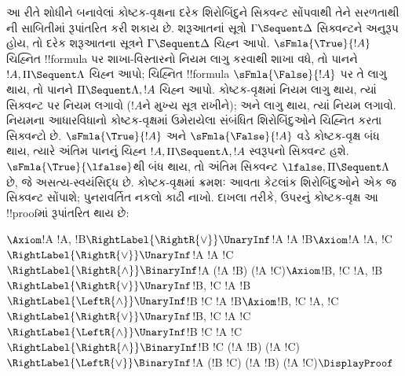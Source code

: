\documentclass[../../../include/open-logic-section]{subfiles}
\begin{document}
આ રીતે શોધીને બનાવેલાં કોષ્ટક-વૃક્ષના દરેક
શિરોબિંદુને સિક્વન્ટ સોંપવાથી તેને સરળતાથી
ની સાબિતીમાં રૂપાંતરિત કરી શકાય છે.
શરૂઆતનાં સૂત્રો $\Gamma \Sequent \Delta$
સિક્વન્ટને અનુરૂપ હોય, તો દરેક શરૂઆતના
સૂત્રને $\Gamma \Sequent \Delta$ ચિહ્ન આપો.
$\sFmla{\True}{!A}$ ચિહ્નિત !!{formula}
પર શાખા-વિસ્તારનો નિયમ લાગુ કરવાથી શાખા
વધે, તો પાનને $!A, \Pi \Sequent \Lambda$
ચિહ્ન આપો; ચિહ્નિત !!{formula}
$\sFmla{\False}{!A}$ પર તે
લાગુ થાય, તો પાનને $\Pi \Sequent \Lambda, !A$
ચિહ્ન આપો. કોષ્ટક-વૃક્ષમાં
\TRule{\True}{\star} નિયમ લાગુ થાય, ત્યાં
સિક્વન્ટ પર \LeftR{\star} નિયમ લગાવો
($!A$ને મુખ્ય સૂત્ર રાખીને); અને
\TRule{\False}{\star} લાગુ થાય, ત્યાં
\RightR{\star} નિયમ લગાવો. નિયમના
આધારવિધાનો કોષ્ટક-વૃક્ષમાં ઉમેરાયેલા
સંબંધિત શિરોબિંદુઓને ચિહ્નિત કરતા સિક્વન્ટો
છે. $\sFmla{\True}{!A}$ અને
$\sFmla{\False}{!A}$ વડે કોષ્ટક-વૃક્ષ બંધ
થાય, ત્યારે અંતિમ પાનનું ચિહ્ન
$!A, \Pi \Sequent \Lambda, !A$ સ્વરૂપનો
સિક્વન્ટ હશે. $\sFmla{\True}{\lfalse}$થી બંધ
થાય, તો અંતિમ સિક્વન્ટ $\lfalse,\Pi\Sequent\Lambda$
છે, જે અસત્ય-સ્વયંસિદ્ધ છે. કોષ્ટક-વૃક્ષમાં ક્રમશઃ આવતા
કેટલાંક શિરોબિંદુઓને એક જ સિક્વન્ટ સોંપાશે;
પુનરાવર્તિત નકલો કાઢી નાખો. દાખલા તરીકે,
ઉપરનું કોષ્ટક-વૃક્ષ આ !!{proof}માં રૂપાંતરિત થાય છે:
\begin{maxwidth}
$
\Axiom$!A \fCenter !A, !B$
\RightLabel{\RightR{\lor}}
\UnaryInf$!A \fCenter !A \lor !B$
\Axiom$!A \fCenter !A, !C$
\RightLabel{\RightR{\lor}}
\UnaryInf$!A \fCenter !A \lor !C$
\RightLabel{\RightR{\land}}
\BinaryInf$!A \fCenter (!A \lor !B) \land (!A \lor !C)$
\Axiom$!B, !C \fCenter !A, !B$
\RightLabel{\RightR{\lor}}
\UnaryInf$!B, !C \fCenter !A \lor !B$
\RightLabel{\LeftR{\land}}
\UnaryInf$!B \land !C \fCenter !A \lor !B$
\Axiom$!B, !C \fCenter !A, !C$
\RightLabel{\RightR{\lor}}
\UnaryInf$!B, !C \fCenter !A \lor !C$
\RightLabel{\LeftR{\land}}
\UnaryInf$!B \land !C \fCenter !A \lor !C$
\RightLabel{\RightR{\land}}
\BinaryInf$!B \land !C \fCenter (!A \lor !B) \land
(!A \lor !C)$
\RightLabel{\LeftR{\lor}}
\BinaryInf$!A \lor (!B \land !C) \fCenter (!A \lor !B) \land
(!A \lor !C)$
\DisplayProof$
\end{maxwidth}
\end{document}
